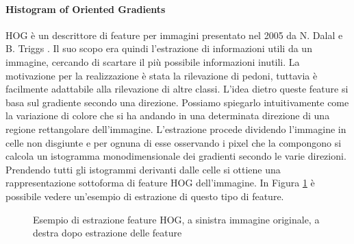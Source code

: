 \paragraph{Histogram of Oriented Gradients}
\ac{HOG} è un descrittore di feature per immagini presentato nel 2005 da N. Dalal e B. Triggs \cite{dalal2005histograms}. Il suo scopo era quindi l'estrazione di informazioni utili da un immagine, cercando di scartare il più possibile informazioni inutili. La motivazione per la realizzazione è stata la rilevazione di pedoni, tuttavia è facilmente adattabile alla rilevazione di altre classi. 
L'idea dietro queste feature si basa sul gradiente secondo una direzione. Possiamo spiegarlo intuitivamente come la variazione di colore che si ha andando in una determinata direzione di una regione rettangolare dell'immagine. 
L'estrazione procede dividendo l'immagine in celle non disgiunte e per ognuna di esse osservando i pixel che la compongono si calcola un istogramma monodimensionale dei gradienti secondo le varie direzioni. Prendendo tutti gli istogrammi derivanti dalle celle si ottiene una rappresentazione sottoforma di feature \ac{HOG} dell'immagine. In Figura \ref{fig:hog} è possibile vedere un'esempio di estrazione di questo tipo di feature.
\begin{figure}[]
    \centering
    \caption{Esempio di estrazione feature HOG, a sinistra immagine originale, a destra dopo estrazione delle feature} 
    \label{fig:hog} 
\end{figure}

